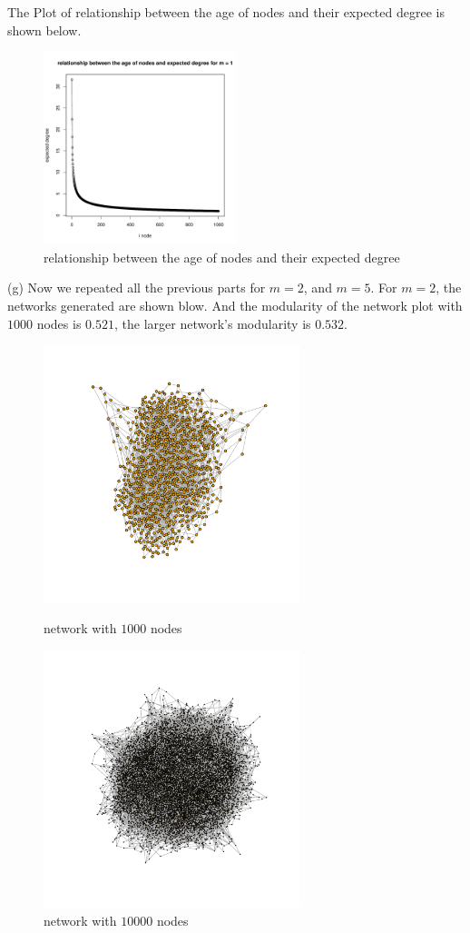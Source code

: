 \documentclass[draftcls,12pt,onecolumn]{IEEEtran}
\begin{document}
The Plot of relationship between the age of nodes and their expected degree is shown below.
\begin{figure}[H]
\centering
\includegraphics[width=0.5\textwidth]{1_2_f.pdf}
\caption{relationship between the age of nodes and their expected degree}
\end{figure}

(g) Now we repeated all the previous parts for $m = 2$, and $m = 5$. 
 For $m = 2$, the networks generated are shown blow. And the modularity of the network plot with $1000$ nodes is $0.521$, the larger network's modularity is $0.532$.
\begin{figure}[htbp]
\centering
\begin{minipage}[t]{0.48\textwidth}
\centering
\includegraphics[width=7.5cm]{img/2_g_1_network}
\caption{network with $1000$ nodes}
\end{minipage}
\begin{minipage}[t]{0.48\textwidth}
\centering
\includegraphics[width=7.5cm]{img/2_g_1_network2}
\caption{network with $10000$ nodes}
\end{minipage}
\end{figure}
\end{document}
